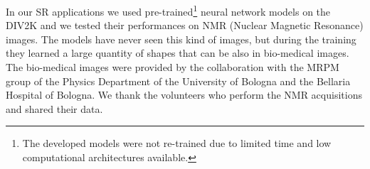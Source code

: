 \documentclass{standalone}
\begin{document}
In our SR applications we used pre-trained\footnote{
  The developed models were not re-trained due to limited time and low computational architectures available.
} neural network models on the DIV2K and we tested their performances on NMR (Nuclear Magnetic Resonance) images.
The models have never seen this kind of images, but during the training they learned a large quantity of shapes that can be  also in bio-medical images.
The bio-medical images were provided by the collaboration with the MRPM group of the Physics Department of the University of Bologna and the Bellaria Hospital of Bologna.
We thank the volunteers who perform the NMR acquisitions and shared their data.
\end{document}
